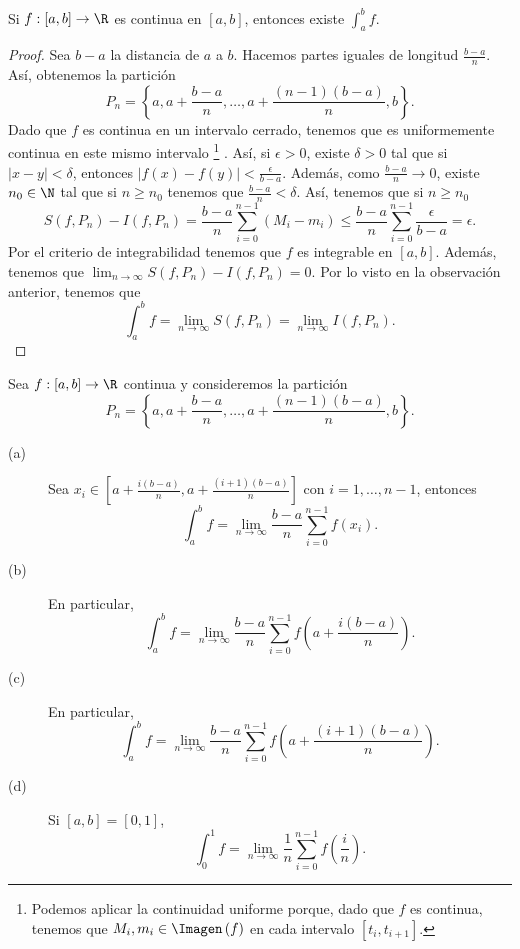 \begin{ftheorem}[]
	\normalfont Si $\displaystyle f : [a,b] \to \R$ es continua en $\displaystyle [a,b] $, entonces existe $\displaystyle \int^{b}_{a} f $.
\end{ftheorem}
\begin{proof}
Sea $\displaystyle b -a  $ la distancia de $\displaystyle a $ a $\displaystyle b $. Hacemos partes iguales de longitud $\displaystyle \frac{b-a}{n} $. Así, obtenemos la partición
\[ P_{n} = \left\{ a, a + \frac{b-a}{n}, \ldots, a + \frac{\left(n-1\right)\left(b-a\right)}{n}, b\right\}  .\]
Dado que $\displaystyle f $ es continua en un intervalo cerrado, tenemos que es uniformemente continua en este mismo intervalo \footnote{Podemos aplicar la continuidad uniforme porque, dado que $\displaystyle f $ es continua, tenemos que $\displaystyle M_{i}, m_{i} \in \Imagen\left(f\right) $ en cada intervalo $\displaystyle [t_{i}, t_{i+1}] $.} . Así, si $\displaystyle \epsilon > 0 $, existe $\displaystyle \delta > 0 $ tal que si $\displaystyle \left|x-y\right| < \delta  $, entonces $\displaystyle \left|f\left(x\right)-f\left(y\right)\right| < \frac{\epsilon }{b-a} $.
Además, como $\displaystyle \frac{b-a}{n} \to 0 $, existe $\displaystyle n_{0} \in \N $ tal que si $\displaystyle n \geq n_{0} $ tenemos que $\displaystyle \frac{b-a}{n} < \delta  $. Así, tenemos que si $\displaystyle n \geq n_{0} $ 
\[ S\left(f,P_{n}\right)-I\left(f,P_{n}\right) = \frac{b-a}{n}\sum^{n-1}_{i=0}\left(M_{i}-m_{i}\right) \leq \frac{b-a}{n}\sum^{n-1}_{i=0}\frac{\epsilon }{b-a} = \epsilon .\]
Por el criterio de integrabilidad tenemos que $\displaystyle f $ es integrable en $\displaystyle [a,b] $. Además, tenemos que $\displaystyle \lim_{n \to \infty}S\left(f,P_{n}\right)-I\left(f,P_{n}\right) = 0 $. Por lo visto en la observación anterior, tenemos que 
\[ \int^{b}_{a} f =\lim_{n \to \infty}S\left(f,P_{n}\right) = \lim_{n \to \infty}I\left(f,P_{n}\right) .\]
\end{proof}
\begin{fcolorary}[]
	\normalfont Sea $\displaystyle f : [a,b] \to \R $ continua y consideremos la partición
	\[ P_{n} = \left\{ a, a + \frac{b-a}{n}, \ldots, a + \frac{\left(n-1\right)\left(b-a\right)}{n}, b\right\}  .\]
	\begin{description}
		\item[(a)] Sea $\displaystyle x_{i} \in \left[a + \frac{i\left(b-a\right)}{n}, a + \frac{\left(i+1\right)\left(b-a\right)}{n}\right]  $ con $\displaystyle i = 1, \ldots, n-1 $, entonces
			\[\int^{b}_{a} f = \lim_{n \to \infty}\frac{b-a}{n}\sum^{n-1}_{i = 0}f\left(x_{i}\right) .\]
		\item[(b)] En particular, 
			\[\int^{b}_{a} f = \lim_{n \to \infty}\frac{b-a}{n}\sum^{n-1}_{i = 0}f\left(a + \frac{i\left(b-a\right)}{n}\right) .\]
		\item[(c)] En particular,
			\[\int^{b}_{a} f = \lim_{n \to \infty}\frac{b-a}{n}\sum^{n-1}_{i = 0}f\left(a + \frac{\left(i+1\right)\left(b-a\right)}{n}\right) .\]
		\item[(d)] Si $\displaystyle [a,b] = [0,1]$, 
			\[\int^{1}_{0} f = \lim_{n \to \infty}\frac{1}{n}\sum^{n-1}_{ i= 0}f\left(\frac{i}{n}\right) .\]
	\end{description}
\end{fcolorary}
